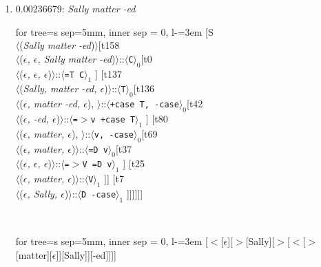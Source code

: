 \documentclass[11pt]{article}
\begin{document}
\begin{enumerate}
	\item  0.00236679: \textit{Sally matter -ed} \\[0.5em]
	\begin{adjustbox}{max width = \textwidth}
	\begin{forest}
	for tree={s sep=5mm, inner sep = 0, l-=3em}
	[S\\$\langle$(\textit{Sally matter -ed})$\rangle$[t158\\$\langle$(\textit{$\epsilon${,} $\epsilon${,} Sally matter -ed})$\rangle$::$\langle$\texttt{C}$\rangle_0$[t0\\$\langle$(\textit{$\epsilon${,} $\epsilon${,} $\epsilon$})$\rangle$::$\langle$\texttt{{=}T C}$\rangle_1$ ] [t137\\$\langle$(\textit{Sally{,} matter -ed{,} $\epsilon$})$\rangle$::$\langle$\texttt{T}$\rangle_0$[t136\\$\langle$(\textit{$\epsilon${,} matter -ed{,} $\epsilon$}){,} $\rangle$::$\langle$\texttt{+case T{,} -case}$\rangle_0$[t42\\$\langle$(\textit{$\epsilon${,} -ed{,} $\epsilon$})$\rangle$::$\langle$\texttt{{=}$>$v +case T}$\rangle_1$ ] [t80\\$\langle$(\textit{$\epsilon${,} matter{,} $\epsilon$}){,} $\rangle$::$\langle$\texttt{v{,} -case}$\rangle_0$[t69\\$\langle$(\textit{$\epsilon${,} matter{,} $\epsilon$})$\rangle$::$\langle$\texttt{{=}D v}$\rangle_0$[t37\\$\langle$(\textit{$\epsilon${,} $\epsilon${,} $\epsilon$})$\rangle$::$\langle$\texttt{{=}$>$V {=}D v}$\rangle_1$ ] [t25\\$\langle$(\textit{$\epsilon${,} matter{,} $\epsilon$})$\rangle$::$\langle$\texttt{V}$\rangle_1$ ]] [t7\\$\langle$(\textit{$\epsilon${,} Sally{,} $\epsilon$})$\rangle$::$\langle$\texttt{D -case}$\rangle_1$ ]]]]]]
	\end{forest}
	\end{adjustbox}
	\\
	\begin{adjustbox}{max width = \textwidth}
	\begin{forest}
	for tree={s sep=5mm, inner sep = 0, l-=3em}
	[$<$[$\epsilon$][$>$[Sally][$>$[$<$[$>$[matter][$\epsilon$]][Sally]][-ed]]]]
	\end{forest}
	\end{adjustbox}
	\newpage


\end{enumerate}
\end{document}
